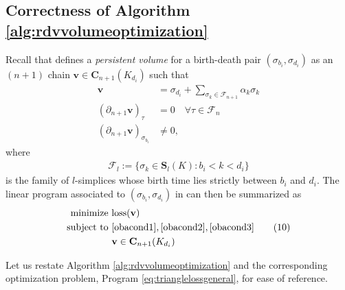 \documentclass[11pt,onecolumn]{article}
\newcommand{\Chains}{\mathbf{C}}
\newcommand{\Simplices}[0]{\mathbf{S}}
\newcommand{\volvec}{\mathbf{v}}
\newcommand{\loss}{\mathrm{loss}}
\newcommand{\simplex}{\sigma}
\theoremstyle{plain}
\theoremstyle{definition}
\begin{document}
\subsection{Correctness of Algorithm \ref{alg:rdvvolumeoptimization}}

Recall that \cite{Obayashi2018} defines a \emph{persistent volume} for a birth-death pair $(\sigma_{b_i}, \sigma_{d_i})$ as an $(n+1)$ chain $\volvec \in \Chains_{n+1}(K_{d_i})$ such that
\begin{align}
    \volvec   & = \sigma_{d_i} + \sum_{\sigma_k \in \mathcal{F}_{n+1}} \alpha_k\sigma_k \label{obacond1} \\
    (\partial_{n+1} \volvec)_\tau  & = 0 \quad \forall \tau \in \mathcal{F}_n \label{obacond2}\\
    (\partial_{n+1} \volvec)_{\sigma_{b_i}}  & \ne 0, \label{obacond3}
\end{align}
where 
    \begin{align}
        {\mathcal F}_l := \{ \simplex_k \in \Simplices_l(K) : b_i < k < d_i \}
        \label{eq:fdef}
    \end{align}
is the family of $l$-simplices whose birth time lies strictly between $b_i$ and $d_i$.
The linear program associated to $(\sigma_{b_i}, \sigma_{d_i})$ in \cite{Obayashi2018} can then be summarized as 
\begin{align}
\begin{split}
    \text{minimize } & \loss(\volvec) \\
    \text{subject to } 
    & \eqref{obacond1}, \eqref{obacond2}, \eqref{obacond3}\\
    & \textbf{v} \in \Chains_{n+1}(K_{d_i}) 
\end{split}
\tag{10}
\label{eq:generalminimalvolume}
\end{align}


Let us restate Algorithm \ref{alg:rdvvolumeoptimization} and the corresponding optimization problem, Program \eqref{eq:trianglelossgeneral}, for ease of reference.
\end{document}
